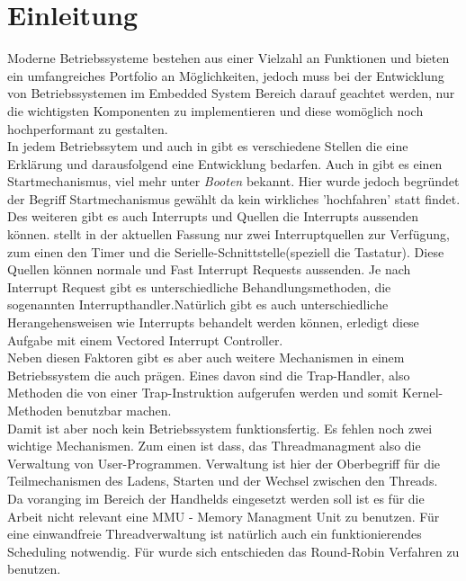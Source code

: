 \section{Einleitung}
Moderne Betriebssysteme bestehen aus einer Vielzahl an Funktionen und bieten ein umfangreiches Portfolio an M\"oglichkeiten, jedoch muss bei der Entwicklung von Betriebssystemen im Embedded System Bereich darauf geachtet werden, nur die wichtigsten Komponenten zu implementieren und diese wom\"oglich noch hochperformant zu gestalten.\\
In jedem Betriebssytem und auch in \mops gibt es verschiedene Stellen die eine Erkl\"arung und darausfolgend eine Entwicklung bedarfen. Auch in \mops gibt es einen Startmechanismus, viel mehr unter \textit{Booten} bekannt. Hier wurde jedoch begr\"undet der Begriff Startmechanismus gew\"ahlt da kein wirkliches 'hochfahren' statt findet.\\
Des weiteren gibt es auch Interrupts und Quellen die Interrupts aussenden k\"onnen. \mops stellt in der aktuellen Fassung nur zwei Interruptquellen zur Verf\"ugung, zum einen den Timer und die Serielle-Schnittstelle(speziell die Tastatur). Diese Quellen k\"onnen normale und Fast Interrupt Requests aussenden. Je nach Interrupt Request gibt es unterschiedliche Behandlungsmethoden, die sogenannten Interrupthandler.Nat\"urlich gibt es auch unterschiedliche Herangehensweisen wie Interrupts behandelt werden k\"onnen, \mops erledigt diese Aufgabe mit einem Vectored Interrupt Controller.\\
Neben diesen Faktoren gibt es aber auch weitere Mechanismen in einem Betriebssystem die auch \mops pr\"agen. Eines davon sind die Trap-Handler, also Methoden die von einer Trap-Instruktion aufgerufen werden und somit Kernel-Methoden benutzbar machen.\\
Damit ist aber noch kein Betriebssystem funktionsfertig. Es fehlen noch zwei wichtige Mechanismen. Zum einen ist dass, das Threadmanagment also die Verwaltung von User-Programmen. Verwaltung ist hier der Oberbegriff f\"ur die Teilmechanismen des Ladens, Starten und der Wechsel zwischen den Threads.\\
Da \mops voranging im Bereich der Handhelds eingesetzt werden soll ist es f\"ur die Arbeit nicht relevant eine MMU - Memory Managment Unit zu benutzen. F\"ur eine einwandfreie Threadverwaltung ist nat\"urlich auch ein funktionierendes Scheduling notwendig. F\"ur \mops wurde sich entschieden das Round-Robin Verfahren zu benutzen.
